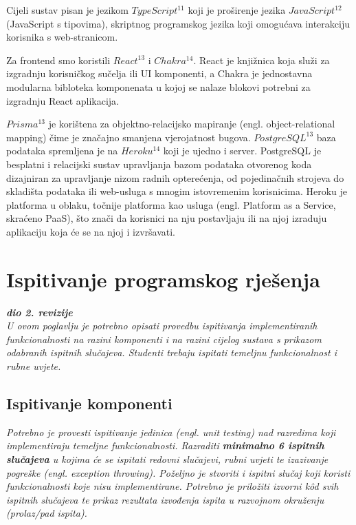 		Cijeli sustav pisan je jezikom $TypeScript^{11}$ koji je proširenje jezika $JavaScript^{12}$ (JavaScript s tipovima), skriptnog programskog jezika koji omogućava interakciju korisnika s web-stranicom.
		
		Za frontend smo koristili $React^{13}$ i $Chakra^{14}$. React je knjižnica koja služi za izgradnju korisničkog sučelja ili UI komponenti, a Chakra je jednostavna modularna bibloteka komponenata	u kojoj se nalaze blokovi potrebni za izgradnju React aplikacija.
		
		$Prisma^{13}$ je korištena za objektno-relacijsko mapiranje (engl. object-relational mapping) čime je	značajno smanjena vjerojatnost bugova. $PostgreSQL^{13}$ baza podataka spremljena je na $Heroku^{14}$	koji je ujedno i server. PostgreSQL je besplatni i relacijski sustav upravljanja bazom podataka otvorenog koda dizajniran za upravljanje nizom radnih opterećenja, od pojedinačnih strojeva do skladišta podataka ili web-usluga s mnogim istovremenim korisnicima. Heroku je platforma u oblaku, točnije platforma kao usluga (engl. Platform as a Service, skraćeno PaaS), što znači da korisnici	na nju postavljaju ili na njoj izraduju aplikaciju koja će se na njoj i izvršavati.
		
			\eject 
		
	
		\section{Ispitivanje programskog rješenja}
			
			\textbf{\textit{dio 2. revizije}}\\
			
			 \textit{U ovom poglavlju je potrebno opisati provedbu ispitivanja implementiranih funkcionalnosti na razini komponenti i na razini cijelog sustava s prikazom odabranih ispitnih slučajeva. Studenti trebaju ispitati temeljnu funkcionalnost i rubne uvjete.}
	
			
			\subsection{Ispitivanje komponenti}
			\textit{Potrebno je provesti ispitivanje jedinica (engl. unit testing) nad razredima koji implementiraju temeljne funkcionalnosti. Razraditi \textbf{minimalno 6 ispitnih slučajeva} u kojima će se ispitati redovni slučajevi, rubni uvjeti te izazivanje pogreške (engl. exception throwing). Poželjno je stvoriti i ispitni slučaj koji koristi funkcionalnosti koje nisu implementirane. Potrebno je priložiti izvorni kôd svih ispitnih slučajeva te prikaz rezultata izvođenja ispita u razvojnom okruženju (prolaz/pad ispita). }
			
